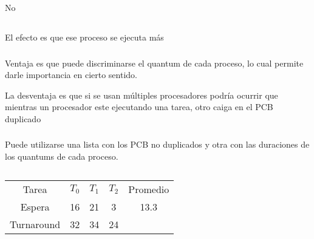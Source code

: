 No

\subsection{}

\subsubsection{}

El efecto es que ese proceso se ejecuta más

\subsubsection{}

Ventaja es que puede discriminarse el quantum de cada proceso, lo cual
permite darle importancia en cierto sentido.

La desventaja es que si se usan múltiples procesadores podría ocurrir que
mientras un procesador este ejecutando una tarea, otro caiga en el PCB
duplicado

\subsubsection{}

Puede utilizarse una lista con los PCB no duplicados y otra con las duraciones
de los quantums de cada proceso.

\setcounter{subsection}{6}
\subsection{}

\subsubsection{}

\begin{tabular}{c c c c c}
Tarea & $T_0$ & $T_1$ & $T_2$ & Promedio \\
Espera & 16 & 21 & 3 & 13.3 \\
Turnaround & 32 & 34 & 24 \\
\end{tabular}